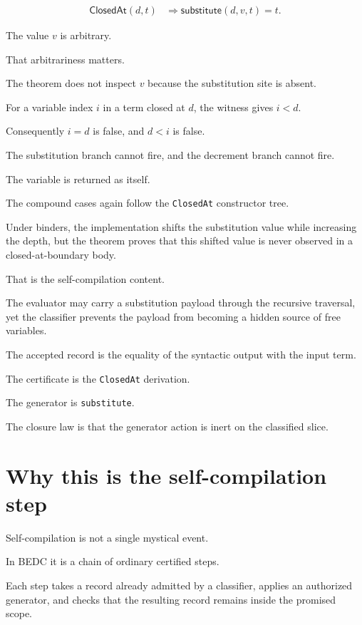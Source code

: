$$
\begin{aligned}
  \mathsf{ClosedAt}(d,t)
  &\Rightarrow
  \mathsf{substitute}(d,v,t)=t.
\end{aligned}
$$

The value $v$ is arbitrary.

That arbitrariness matters.

The theorem does not inspect $v$ because the substitution site is absent.

For a variable index $i$ in a term closed at $d$,
the witness gives $i<d$.

Consequently $i=d$ is false, and $d<i$ is false.

The substitution branch cannot fire, and the decrement branch cannot fire.

The variable is returned as itself.

The compound cases again follow the \texttt{ClosedAt} constructor tree.

Under binders, the implementation shifts the substitution value while increasing
the depth, but the theorem proves that this shifted value is never observed in a
closed-at-boundary body.

That is the self-compilation content.

The evaluator may carry a substitution payload through the recursive traversal,
yet the classifier prevents the payload from becoming a hidden source of free
variables.

The accepted record is the equality of the syntactic output with the input term.

The certificate is the \texttt{ClosedAt} derivation.

The generator is \texttt{substitute}.

The closure law is that the generator action is inert on the classified slice.

\section{Why this is the self-compilation step}
\label{sec:closed-term-substitution-self-compilation-step}

Self-compilation is not a single mystical event.

In BEDC it is a chain of ordinary certified steps.

Each step takes a record already admitted by a classifier, applies an authorized
generator, and checks that the resulting record remains inside the promised
scope.

